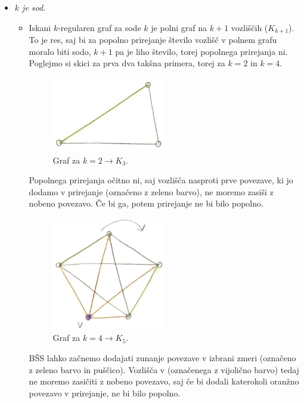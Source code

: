 \documentclass[a4paper,11pt]{article}
\begin{document}
\noindent
\begin{itemize}
\item \textit{$k$ je sod}. 
    \begin{itemize}[label={}]
        \item Iskani $k$-regularen graf za sode $k$ je polni graf na $k + 1$ vozliščih ($K_{k + 1}$). To je res, saj bi za popolno prirejanje število vozlišč v polnem grafu moralo biti sodo, $k + 1$ pa je liho število, torej popolnega prirejanja ni.
                Poglejmo si skici za prva dva takšna primera, torej za $k = 2$ in $k = 4$.

                        \begin{figure}[ht!]
                            \centering
                            \includegraphics[width=50mm]{k_sod_1.png}
                            \caption{Graf za $k = 2 \rightarrow K_3$.}
                        \end{figure}
                        \noindent
                        Popolnega prirejanja očitno ni, saj vozlišča nasproti prve povezave, ki jo dodamo v prirejanje (označeno z zeleno barvo), ne moremo zasiši z nobeno povezavo. Če bi ga, potem prirejanje ne bi bilo popolno.
                                
                        \newpage
                        \begin{figure}[ht!]
                            \centering
                            \includegraphics[width=50mm]{k_sod_2.png}
                            \caption{Graf za $k = 4 \rightarrow K_5$.}
                        \end{figure}
                        \noindent
                        BŠS lahko začnemo dodajati zunanje povezave v izbrani zmeri (označeno z zeleno barvo in puščico). Vozlišča v (označenega z vijolično barvo) tedaj ne moremo zasičiti z nobeno povezavo, saj če bi dodali katerokoli oranžno povezavo v prirejanje, ne bi bilo popolno.
    

\end{itemize}
\end{itemize}
\end{document}
